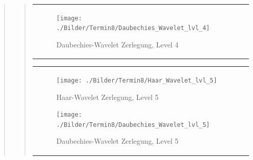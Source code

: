 \begin{quote}
\begin{quote}
\begin{center}
\begin{tabular}{ll}
\begin{minipage}{0.6\textwidth}
                    \end{minipage}
                    \begin{minipage}{0.6\textwidth}
    
                        \begin{figure}[H]
                            \label{fig:}
                            \texttt{[image: ./Bilder/Termin8/Daubechies\_Wavelet\_lvl\_4]}
                            \caption{Daubechies-Wavelet Zerlegung, Level 4}
                        \end{figure}
                    \vspace{-1.5em}
    
                    \end{minipage}
    
                \end{tabular}
                \end{center}
    
                
                
                    \begin{center}
                \begin{tabular}{ll}
    
                \hspace{-12em}
                    \begin{minipage}{0.6\textwidth}
    
                        \begin{figure}[H]
                            \label{fig:}
                            \texttt{[image: ./Bilder/Termin8/Haar\_Wavelet\_lvl\_5]}
                            \caption{Haar-Wavelet Zerlegung, Level 5}
                        \end{figure}
    
                    \end{minipage}
                    \begin{minipage}{0.6\textwidth}
    
                        \begin{figure}[H]
                            \label{fig:}
                            \texttt{[image: ./Bilder/Termin8/Daubechies\_Wavelet\_lvl\_5]}
                            \caption{Daubechies-Wavelet Zerlegung, Level 5}
                        \end{figure}
                    \vspace{-1.5em}
    

\end{minipage}
\end{tabular}
\end{center}
\end{quote}
\end{quote}
